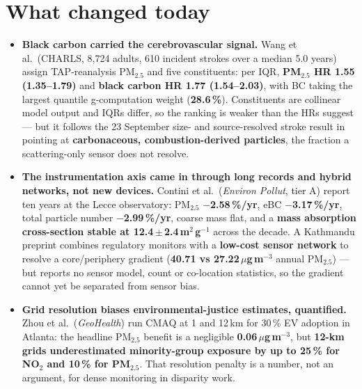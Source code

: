\documentclass[10pt]{article}
\begin{document}
\vspace{3mm}

\section*{\sffamily\bfseries\color{Deep}What changed today}
\vspace{-1.5mm}{\color{Amber}\rule{\linewidth}{1.1pt}}\vspace{2.5mm}

\footnotesize
\begin{itemize}

\item \textbf{Black carbon carried the cerebrovascular signal.} Wang et al.\ (CHARLS, 8,724
adults, 610 incident strokes over a median 5.0 years) assign TAP-reanalysis PM$_{2.5}$ and five
constituents: per IQR, \textbf{PM$_{2.5}$ HR 1.55 (1.35--1.79)} and \textbf{black carbon HR
1.77 (1.54--2.03)}, with BC taking the largest quantile g-computation weight (\textbf{28.6\,\%}).
Constituents are collinear model output and IQRs differ, so the ranking is weaker than the HRs
suggest --- but it follows the 23 September size- and source-resolved stroke result in pointing
at \textbf{carbonaceous, combustion-derived particles}, the fraction a scattering-only sensor
does not resolve.

\item \textbf{The instrumentation axis came in through long records and hybrid networks, not
new devices.} Contini et al.\ (\textit{Environ Pollut}, tier A) report ten years at the Lecce
observatory: PM$_{2.5}$ \textbf{$-$2.58\,\%/yr}, eBC \textbf{$-$3.17\,\%/yr}, total particle
number \textbf{$-$2.99\,\%/yr}, coarse mass flat, and a \textbf{mass absorption cross-section
stable at 12.4\,$\pm$\,2.4\,m$^2$\,g$^{-1}$} across the decade. A Kathmandu preprint combines
regulatory monitors with a \textbf{low-cost sensor network} to resolve a core/periphery
gradient (\textbf{40.71 vs 27.22\,$\mu$g\,m$^{-3}$} annual PM$_{2.5}$) --- but reports no sensor
model, count or co-location statistics, so the gradient cannot yet be separated from sensor
bias.

\item \textbf{Grid resolution biases environmental-justice estimates, quantified.} Zhou et al.\
(\textit{GeoHealth}) run CMAQ at 1 and 12\,km for 30\,\% EV adoption in Atlanta: the headline
PM$_{2.5}$ benefit is a negligible \textbf{0.06\,$\mu$g\,m$^{-3}$}, but \textbf{12-km grids
underestimated minority-group exposure by up to 25\,\% for NO$_2$ and 10\,\% for PM$_{2.5}$}.
That resolution penalty is a number, not an argument, for dense monitoring in disparity work.


\end{itemize}
\end{document}
